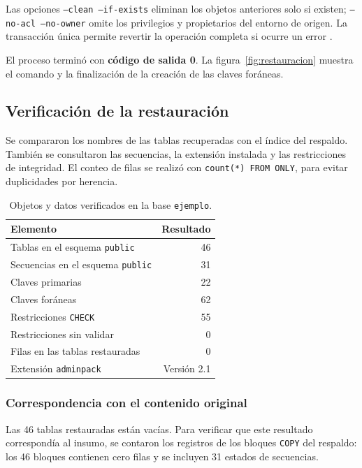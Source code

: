 Las opciones \texttt{--clean --if-exists} eliminan los objetos anteriores
solo si existen; \texttt{--no-acl --no-owner} omite los privilegios y
propietarios del entorno de origen. La transacción única permite revertir
la operación completa si ocurre un error \citep{pg-restore}.

El proceso terminó con \textbf{código de salida 0}. La figura~\ref{fig:restauracion}
muestra el comando y la finalización de la creación de las claves foráneas.

\clearpage
\subsection{Verificación de la restauración}
Se compararon los nombres de las tablas recuperadas con el índice del
respaldo. También se consultaron las secuencias, la extensión instalada
y las restricciones de integridad. El conteo de filas se realizó con
\texttt{count(*) FROM ONLY}, para evitar duplicidades por herencia.

\begin{table}[h!]
\centering
\caption{Objetos y datos verificados en la base \texttt{ejemplo}.}
\label{tab:restauracion}
\begingroup\renewcommand{\arraystretch}{1.45}
\begin{tabularx}{.94\linewidth}{@{}Jr@{}}
\toprule{}\textbf{Elemento} & \textbf{Resultado}\\\midrule
Tablas en el esquema \texttt{public} & 46\\
Secuencias en el esquema \texttt{public} & 31\\
Claves primarias & 22\\
Claves foráneas & 62\\
Restricciones \texttt{CHECK} & 55\\
Restricciones sin validar & 0\\
Filas en las tablas restauradas & 0\\
Extensión \texttt{adminpack} & Versión 2.1\\\bottomrule
\end{tabularx}\endgroup
\end{table}

\subsubsection{Correspondencia con el contenido original}
Las 46 tablas restauradas están vacías. Para verificar que este resultado
correspondía al insumo, se contaron los registros de los bloques
\texttt{COPY} del respaldo: los 46 bloques contienen cero filas y se
incluyen 31 estados de secuencias.

